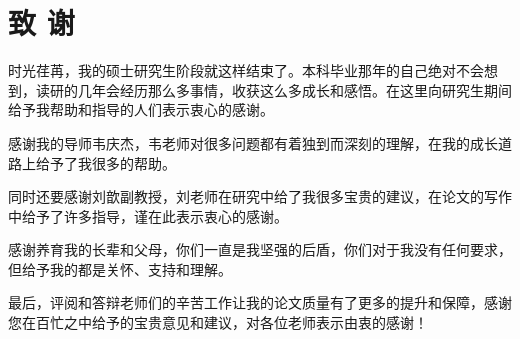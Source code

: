 \chapter{致 \quad 谢}
\thispagestyle{others}
\pagestyle{others}
\xiaosi
%
时光荏苒，我的硕士研究生阶段就这样结束了。本科毕业那年的自己绝对不会想到，读研的几年会经历那么多事情，收获这么多成长和感悟。在这里向研究生期间给予我帮助和指导的人们表示衷心的感谢。

感谢我的导师韦庆杰，韦老师对很多问题都有着独到而深刻的理解，在我的成长道路上给予了我很多的帮助。

同时还要感谢刘歆副教授，刘老师在研究中给了我很多宝贵的建议，在论文的写作中给予了许多指导，谨在此表示衷心的感谢。

感谢养育我的长辈和父母，你们一直是我坚强的后盾，你们对于我没有任何要求，但给予我的都是关怀、支持和理解。

最后，评阅和答辩老师们的辛苦工作让我的论文质量有了更多的提升和保障，感谢您在百忙之中给予的宝贵意见和建议，对各位老师表示由衷的感谢！



